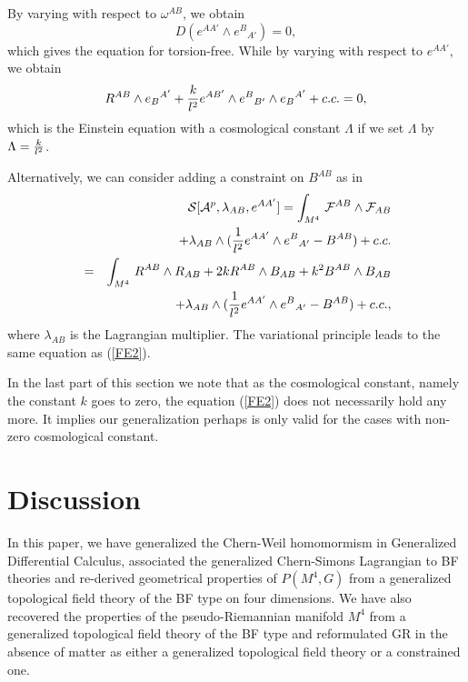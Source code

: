 \documentclass[a4paper,twocolumn,showpacs,prd]{revtex4}
\begin{document}
By varying with respect to $\omega^{AB}$, we
obtain
\begin{equation}
D(e^{AA'}\wedge e^{B}{}_{A'})=0 ,\label{FE1}
\end{equation}
which gives the equation for  torsion-free. While
by varying with respect to $e^{AA'}$, we obtain
\begin{equation}
R^{AB}\wedge e_B{}^{A'}+{k\over l^2} e^{AB'}\wedge e^{B}{}_{B'}
\wedge e_B{}^{A'}+c.c.=0 ,\label{FE2}
\end{equation}
which is the Einstein equation with a cosmological constant
$\Lambda $ if we set $\Lambda$ by $\Lambda ={k\over l^2}$.

Alternatively,  we can consider adding a constraint on $B^{AB}$ as
in \cite{Smolin}
\begin{eqnarray}
&&{\cal S}[{\cal A}^p,\lambda_{AB},e^{AA'}] =\int_{M^4}\,
{\cal F}^{AB}\wedge {\cal F}_{AB} \nonumber\\
&&+\lambda_{AB}
\wedge ({1\over l^2} e^{AA'}
\wedge e^{B}{}_{A'}-B^{AB}) + c.c.\nonumber\\
&=& \int_{M^4}\, R^{AB} \wedge R_{AB} + 2k
R^{AB}\wedge B_{AB}+k^2
B^{AB}\wedge B_{AB}  \nonumber\\
 &&+ \lambda_{AB} \wedge
( {1\over l^2} e^{AA'}\wedge e^{B}{}_{A'}-B^{AB}) + c.c.,
\end{eqnarray}
where $\lambda_{AB}$ is the Lagrangian multiplier. The variational
principle leads to the same equation as (\ref{FE2}).


In the last part of this section we note that as the cosmological
constant, namely the constant $k$ goes to zero, the equation
(\ref{FE2}) does not necessarily hold any more. It implies our
generalization perhaps is only valid for the cases with non-zero
cosmological constant.


\section{Discussion}

In this paper, we have generalized the Chern-Weil  homomormism in
Generalized Differential Calculus, associated the generalized
Chern-Simons Lagrangian to BF theories and re-derived geometrical
properties of $P(M^4, G)$ from a generalized topological field
theory of the BF type on four dimensions. We have also recovered
the properties of the pseudo-Riemannian manifold $M^4$ from a
generalized topological field theory of the BF type and
reformulated GR in the absence of matter as either a generalized
topological field theory or a constrained one.
\end{document}
